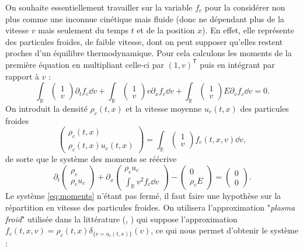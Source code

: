 On souhaite essentiellement travailler sur la variable $f_c$ pour la considérer non plus comme une inconnue cinétique mais fluide (donc ne dépendant plus de la vitesse $v$ mais seulement du temps $t$ et de la position $x$). En effet, elle représente des particules froides, de faible vitesse, dont on peut supposer qu'elles restent proches d'un équilibre thermodynamique. Pour cela calculons les moments de la première équation en multipliant celle-ci par $(1,v)^{\textsf{T}}$ puis en intégrant par rapport à $v$ :
$$
  \int_{\mathbb{R}} \begin{pmatrix}1 \\ v\end{pmatrix} \partial_tf_c \dd{v}
  + \int_{\mathbb{R}} \begin{pmatrix}1 \\ v\end{pmatrix} v\partial_xf_c \dd{v}
  + \int_{\mathbb{R}} \begin{pmatrix}1 \\ v\end{pmatrix} E\partial_vf_c \dd{v} = 0. 
$$
On introduit la densité $\rho_c(t, x)$ et la vitesse moyenne $u_c(t, x)$ des particules froides
$$
\begin{pmatrix}\rho_c(t, x) \\ \rho_c(t, x) u_c(t, x)\end{pmatrix}
= 
\int_{\mathbb{R}} \begin{pmatrix}1 \\ v\end{pmatrix}f_c(t, x, v) \dd{v},   
$$
de sorte que le système des moments se réécrive
\begin{equation}
  \partial_t \begin{pmatrix}\rho_c \\ \rho_c u_c \end{pmatrix}
  + \partial_x \begin{pmatrix} \rho_c u_c \\  \int_{\mathbb{R}} v^2 f_c  \dd{v} \end{pmatrix}
  - \begin{pmatrix} 0 \\ \rho_c E \end{pmatrix}
  = \begin{pmatrix} 0 \\ 0 \end{pmatrix}.
\label{eq:moments}
\end{equation}
Le système \eqref{eq:moments} n'étant pas fermé, il faut faire une hypothèse sur la répartition en vitesse des particules froides. On utilisera l'approximation "\emph{plasma froid}" utilisée dans la littérature (\cite{Tronci:2014}, \cite{Holderied:2019}) qui suppose l'approximation $f_c(t,x,v) = \rho_c(t,x)\delta_{\{v=u_c(t,x)\}}(v)$, ce qui nous permet d'obtenir le système :
